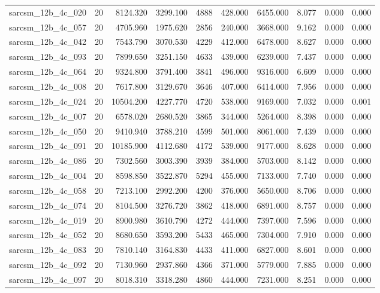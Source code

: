 \begin{tabular}{lrrrrrrrrr}
sarcsm\_12b\_4c\_020 & 20 & 8124.320 & 3299.100 & 4888 & 428.000 & 6455.000 & 8.077 & 0.000 & 0.000 \\
sarcsm\_12b\_4c\_057 & 20 & 4705.960 & 1975.620 & 2856 & 240.000 & 3668.000 & 9.162 & 0.000 & 0.000 \\
sarcsm\_12b\_4c\_042 & 20 & 7543.790 & 3070.530 & 4229 & 412.000 & 6478.000 & 8.627 & 0.000 & 0.000 \\
sarcsm\_12b\_4c\_093 & 20 & 7899.650 & 3251.150 & 4633 & 439.000 & 6239.000 & 7.437 & 0.000 & 0.000 \\
sarcsm\_12b\_4c\_064 & 20 & 9324.800 & 3791.400 & 3841 & 496.000 & 9316.000 & 6.609 & 0.000 & 0.000 \\
sarcsm\_12b\_4c\_008 & 20 & 7617.800 & 3129.670 & 3646 & 407.000 & 6414.000 & 7.956 & 0.000 & 0.000 \\
sarcsm\_12b\_4c\_024 & 20 & 10504.200 & 4227.770 & 4720 & 538.000 & 9169.000 & 7.032 & 0.000 & 0.001 \\
sarcsm\_12b\_4c\_007 & 20 & 6578.020 & 2680.520 & 3865 & 344.000 & 5264.000 & 8.398 & 0.000 & 0.000 \\
sarcsm\_12b\_4c\_050 & 20 & 9410.940 & 3788.210 & 4599 & 501.000 & 8061.000 & 7.439 & 0.000 & 0.000 \\
sarcsm\_12b\_4c\_091 & 20 & 10185.900 & 4112.680 & 4172 & 539.000 & 9177.000 & 8.628 & 0.000 & 0.000 \\
sarcsm\_12b\_4c\_086 & 20 & 7302.560 & 3003.390 & 3939 & 384.000 & 5703.000 & 8.142 & 0.000 & 0.000 \\
sarcsm\_12b\_4c\_004 & 20 & 8598.850 & 3522.870 & 5294 & 455.000 & 7133.000 & 7.740 & 0.000 & 0.000 \\
sarcsm\_12b\_4c\_058 & 20 & 7213.100 & 2992.200 & 4200 & 376.000 & 5650.000 & 8.706 & 0.000 & 0.000 \\
sarcsm\_12b\_4c\_074 & 20 & 8104.500 & 3276.720 & 3862 & 418.000 & 6891.000 & 8.757 & 0.000 & 0.000 \\
sarcsm\_12b\_4c\_019 & 20 & 8900.980 & 3610.790 & 4272 & 444.000 & 7397.000 & 7.596 & 0.000 & 0.000 \\
sarcsm\_12b\_4c\_052 & 20 & 8680.650 & 3593.200 & 5433 & 465.000 & 7304.000 & 7.910 & 0.000 & 0.000 \\
sarcsm\_12b\_4c\_083 & 20 & 7810.140 & 3164.830 & 4433 & 411.000 & 6827.000 & 8.601 & 0.000 & 0.000 \\
sarcsm\_12b\_4c\_092 & 20 & 7130.960 & 2937.860 & 4366 & 371.000 & 5779.000 & 7.885 & 0.000 & 0.000 \\
sarcsm\_12b\_4c\_097 & 20 & 8018.310 & 3318.280 & 4860 & 444.000 & 7231.000 & 8.251 & 0.000 & 0.000 \\

\end{tabular}
